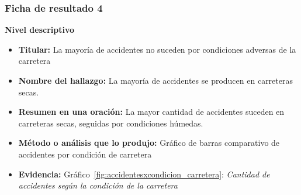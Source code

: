 \documentclass[12pt]{article}
\begin{document}
\subsubsection{Ficha de resultado 4}
\textbf{Nivel descriptivo} 
\begin{itemize}
    \item \textbf{Titular:}   La mayoría de accidentes no suceden por condiciones 
    adversas de la carretera\\

    \item \textbf{Nombre del hallazgo:} La mayoría de accidentes se producen 
    en carreteras secas. \\

    \item \textbf{Resumen en una oración:} La mayor cantidad de accidentes suceden
    en carreteras secas, seguidas por condiciones húmedas. \\

    \item \textbf{Método o análisis que lo produjo:}  Gráfico de barras comparativo 
    de accidentes por condición de carretera\\

    \item \textbf{Evidencia:} Gráfico~\ref{fig:accidentesxcondicion_carretera}: 
    \textit{Cantidad de accidentes según la condición de la carretera} \\
\end{itemize} 
\end{document}
